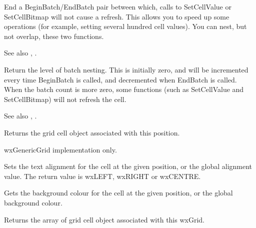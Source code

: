 \label{endbatch}


End a BeginBatch/EndBatch pair between which, calls to SetCellValue or
SetCellBitmap will not cause a refresh. This allows you to speed up some operations
(for example, setting several hundred cell values). You can nest, but not overlap,
these two functions.

See also , .

\label{getbatchcount}


Return the level of batch nesting. This is initially zero, and will be incremented
every time BeginBatch is called, and decremented when EndBatch is called. When the
batch count is more zero, some functions (such as SetCellValue and SetCellBitmap) will
not refresh the cell.

See also , .



Returns the grid cell object associated with this position.

wxGenericGrid implementation only.




Sets the text alignment for the cell at the given position, or the global alignment value.
The return value is wxLEFT, wxRIGHT or wxCENTRE.




Gets the background colour for the cell at the given position, or the global background colour.



Returns the array of grid cell object associated with this wxGrid.

